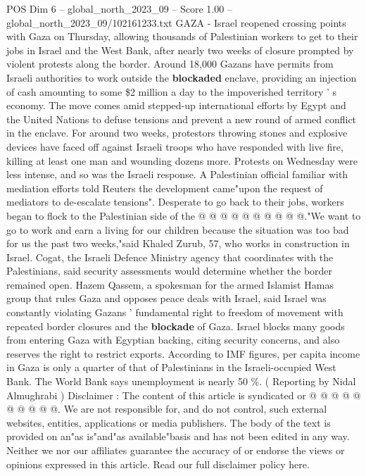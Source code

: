 \begin{textsample}{POS Dim 6 – global\_north\_2023\_09 – Score 1.00 – global\_north\_2023\_09/102161233.txt}  \label{ex:f6_pos_110}
GAZA - Israel reopened crossing points with Gaza on Thursday, allowing thousands of Palestinian workers to get to their jobs in Israel and the West Bank, after nearly two weeks of closure prompted by violent protests along the border.
Around 18,000 Gazans have permits from Israeli authorities to work outside the \textbf{blockaded} enclave, providing an injection of cash amounting to some \$2 million a day to the impoverished territory ' s economy.
The move comes amid stepped-up international efforts by Egypt and the United Nations to defuse tensions and prevent a new round of armed conflict in the enclave.
For around two weeks, protestors throwing stones and explosive devices have faced off against Israeli troops who have responded with live fire, killing at least one man and wounding dozens more.
Protests on Wednesday were less intense, and so was the Israeli response.
A Palestinian official familiar with mediation efforts told Reuters the development came"upon the request of mediators to de-escalate tensions".
Desperate to go back to their jobs, workers began to flock to the Palestinian side of the @ @ @ @ @ @ @ @ @ @."We want to go to work and earn a living for our children because the situation was too bad for us the past two weeks,"said Khaled Zurub, 57, who works in construction in Israel.
Cogat, the Israeli Defence Ministry agency that coordinates with the Palestinians, said security assessments would determine whether the border remained open.
Hazem Qassem, a spokesman for the armed Islamist Hamas group that rules Gaza and opposes peace deals with Israel, said Israel was constantly violating Gazans ' fundamental right to freedom of movement with repeated border closures and the \textbf{blockade} of Gaza.
Israel blocks many goods from entering Gaza with Egyptian backing, citing security concerns, and also reserves the right to restrict exports.
According to IMF figures, per capita income in Gaza is only a quarter of that of Palestinians in the Israeli-occupied West Bank.
The World Bank says unemployment is nearly 50 \%. ( Reporting by Nidal Almughrabi ) Disclaimer : The content of this article is syndicated or @ @ @ @ @ @ @ @ @ @.
We are not responsible for, and do not control, such external websites, entities, applications or media publishers.
The body of the text is provided on an"as is"and"as available"basis and has not been edited in any way.
Neither we nor our affiliates guarantee the accuracy of or endorse the views or opinions expressed in this article.
Read our full disclaimer policy here.

\end{textsample}
